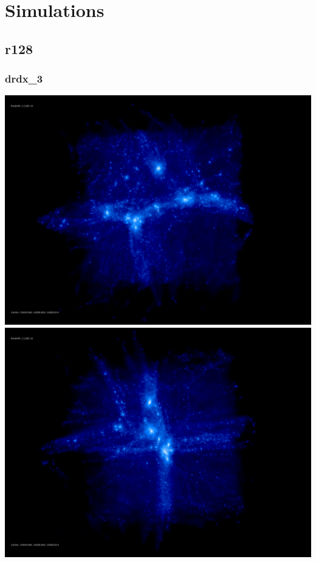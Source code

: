 \chapter{Simulations} 


\section{r128} 

\subsection{drdx\_3} 

\includegraphics[scale=0.12]{r128/drdx_3/rotate_00185.jpg} 
\includegraphics[scale=0.12]{r128/drdx_3/rotate_00136.jpg} 

